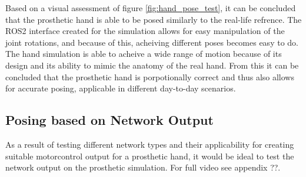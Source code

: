 \documentclass[../main.tex]{subfiles}
\begin{document}
Based on a visual assessment of figure \ref{fig:hand_pose_test}, it can be concluded that the prosthetic hand is able to be posed similarly to the real-life refrence.
The ROS2 interface created for the simulation allows for easy manipulation of the joint rotations, and because of this, acheiving different poses becomes easy to do.
The hand simulation is able to acheive a wide range of motion because of its design and its ability to mimic the anatomy of the real hand.
From this it can be concluded that the prosthetic hand is porpotionally correct and thus also allows for accurate posing, applicable in different day-to-day scenarios.

\subsection{Posing based on Network Output}

As a result of testing different network types and their applicability for creating suitable motorcontrol output for a prosthetic hand, it would be ideal to test the network output on the prosthetic simulation.
For full video see appendix ??.






\end{document}

